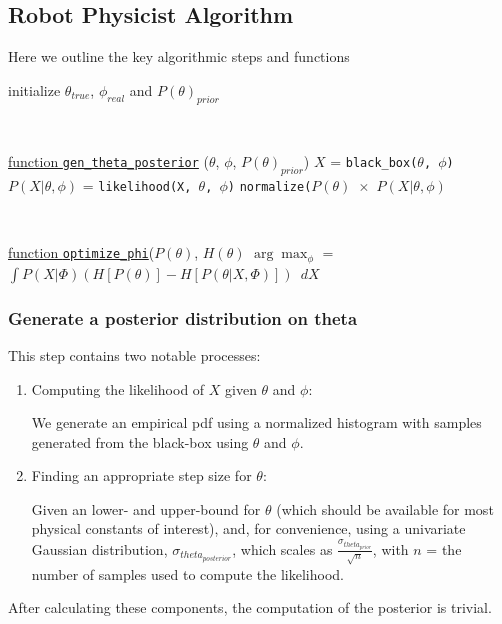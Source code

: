 \documentclass[10pt,journal,compsoc]{IEEEtran}
\begin{document}
\subsection{Robot Physicist Algorithm}
Here we outline the key algorithmic steps and functions
\begin{algorithm}
 initialize $\theta_{true}$, $\phi_{real}$ and $P(\theta)_{prior}$\;

\

    \underline{function \texttt{gen\_theta\_posterior}} ($\theta$, $\phi$, $P(\theta)_{prior}$)\;
    $X$ = \texttt{black\_box($\theta$, $\phi$)}\;
    $P(X | \theta, \phi) $ = \texttt{likelihood(X, $\theta$, $\phi$)}\;
    \Return \texttt{normalize($P(\theta)$ $\times$ $P(X | \theta, \phi) $}\;

\

	\underline{function \texttt{optimize\_phi}}($P(\theta)$, $H(\theta)$\;
    \Return $\arg\max_\phi$ = $\int P(X|\Phi) (H[P(\theta)]-H[P(\theta|X,\Phi)])$ $\, dX$
\end{algorithm}


\subsubsection{Generate a posterior distribution on theta}
This step contains two notable processes:
\begin{enumerate}
\item Computing the likelihood of $X$ given $\theta$ and $\phi$:

We generate an empirical pdf using a normalized histogram with samples generated from the black-box using $\theta$ and $\phi$.
\item Finding an appropriate step size for $\theta $:

Given an lower- and upper-bound for $\theta$ (which should be available for most physical constants of interest), and, for convenience, using a univariate Gaussian distribution, $\sigma_{theta_{posterior}}$, which scales as $\frac{\sigma_{theta_{prior}}}{\sqrt{n}}$, with $n$ = the number of samples used to compute the likelihood.
\end{enumerate}
After calculating these components, the computation of the posterior is trivial.
\end{document}
